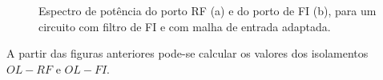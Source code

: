 \documentclass[11pt]{article}
\numberwithin{equation}{section}
\begin{document}
\pagebreak

\begin{figure}[h]
	\centering
	\hspace{8mm}
	\vspace{-0.8em}
	\caption{Espectro de potência do porto RF (a) e do porto de FI (b), para um circuito com filtro de FI e com malha de entrada adaptada.}
	\vspace{-0.8em}
\end{figure}

A partir das figuras anteriores pode-se calcular os valores dos isolamentos $OL - RF$ e $OL - FI$.
\end{document}
